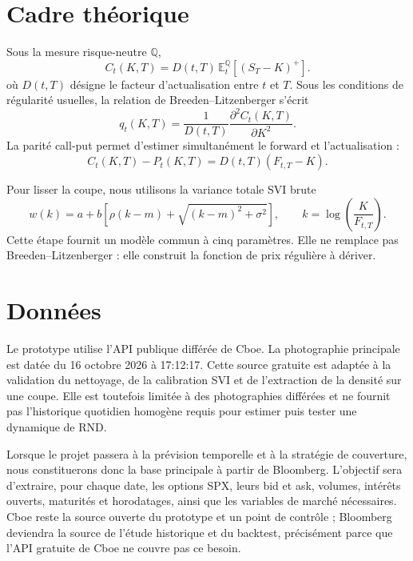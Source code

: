 \documentclass[11pt,a4paper]{article}
\numberwithin{equation}{section}
\begin{document}
\section{Cadre théorique}
Sous la mesure risque-neutre $\mathbb{Q}$,
\begin{equation}
  C_t(K,T)
  = D(t,T)\,
    \mathbb{E}^{\mathbb{Q}}_t\!\left[\left(S_T-K\right)^{+}\right].
  \label{eq:call-price}
\end{equation}
où $D(t,T)$ désigne le facteur d'actualisation entre $t$ et $T$. Sous les
conditions de régularité usuelles, la relation de Breeden--Litzenberger s'écrit
\begin{equation}
  q_t(K,T)
  = \frac{1}{D(t,T)}
    \frac{\partial^2 C_t(K,T)}{\partial K^2}.
  \label{eq:bl-density}
\end{equation}
La parité call-put permet d'estimer simultanément le forward et l'actualisation :
\begin{equation}
  C_t(K,T)-P_t(K,T)
  = D(t,T)\left(F_{t,T}-K\right).
  \label{eq:put-call-parity}
\end{equation}

Pour lisser la coupe, nous utilisons la variance totale SVI brute
\begin{equation}
  w(k)
  = a+b\left[\rho(k-m)+\sqrt{(k-m)^2+\sigma^2}\right],
  \qquad
  k=\log\!\left(\frac{K}{F_{t,T}}\right).
  \label{eq:svi}
\end{equation}
Cette étape fournit un modèle commun à cinq paramètres. Elle ne remplace pas
Breeden--Litzenberger : elle construit la fonction de prix régulière à dériver.

\section{Données}
Le prototype utilise l'API publique différée de Cboe. La photographie principale est
datée du 16 octobre 2026 à 17:12:17. Cette source gratuite est adaptée à la validation
du nettoyage, de la calibration SVI et de l'extraction de la densité sur une coupe.
Elle est toutefois limitée à des photographies différées et ne fournit pas l'historique
quotidien homogène requis pour estimer puis tester une dynamique de RND.

Lorsque le projet passera à la prévision temporelle et à la stratégie de couverture,
nous constituerons donc la base principale à partir de Bloomberg. L'objectif sera
d'extraire, pour chaque date, les options SPX, leurs bid et ask, volumes, intérêts
ouverts, maturités et horodatages, ainsi que les variables de marché nécessaires. Cboe
reste la source ouverte du prototype et un point de contrôle ; Bloomberg deviendra la
source de l'étude historique et du backtest, précisément parce que l'API gratuite de
Cboe ne couvre pas ce besoin.
\end{document}

